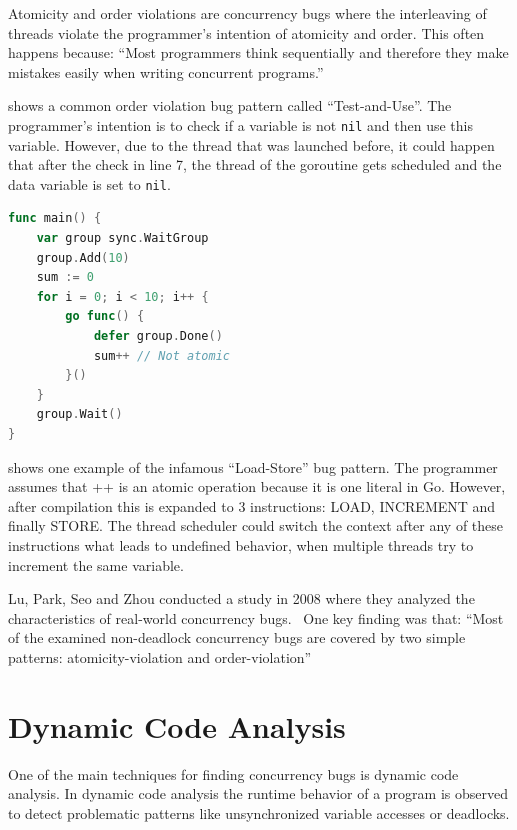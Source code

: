 \documentclass[conference]{IEEEtran}
\begin{document}
Atomicity and order violations are concurrency bugs where the interleaving of threads violate the programmer's intention of atomicity and order.
This often happens because:
``Most programmers think sequentially and therefore they make mistakes easily when writing concurrent programs.''~\cite{lu2008mistakes}

 shows a common order violation bug pattern called ``Test-and-Use''.
The programmer's intention is to check if a variable is not \lstinline{nil} and then use this variable.
However, due to the thread that was launched before, it could happen that after the check in line 7, the thread of the goroutine gets scheduled and the data variable is set to \lstinline{nil}.

\begin{lstlisting}[float=h, language=Go, label=lst:atomicity, caption=Load-Store bug pattern -- Atomicity violation]
func main() {
    var group sync.WaitGroup
    group.Add(10)
    sum := 0
    for i = 0; i < 10; i++ {
        go func() {
            defer group.Done()
            sum++ // Not atomic
        }()
    }
    group.Wait()
}
\end{lstlisting}

 shows one example of the infamous ``Load-Store'' bug pattern.
The programmer assumes that ++ is an atomic operation because it is one literal in Go.
However, after compilation this is expanded to 3 instructions: LOAD, INCREMENT and finally STORE.
The thread scheduler could switch the context after any of these instructions what leads to undefined behavior, when multiple threads try to increment the same variable.

Lu, Park, Seo and Zhou conducted a study in 2008 where they analyzed the characteristics of real-world concurrency bugs.~\cite{lu2008mistakes}
One key finding was that:
``Most of the examined non-deadlock concurrency bugs are covered by two simple patterns: atomicity-violation and order-violation''~\cite{lu2008mistakes}


\section{Dynamic Code Analysis}
\label{sct:dynamic}

One of the main techniques for finding concurrency bugs is dynamic code analysis.
In dynamic code analysis the runtime behavior of a program is observed to detect problematic patterns like unsynchronized variable accesses or deadlocks.
\end{document}

